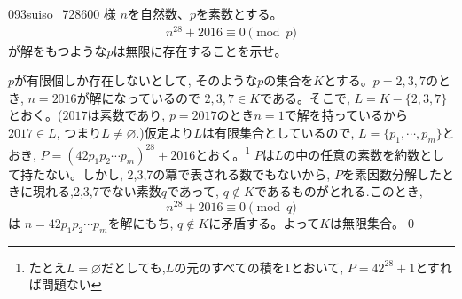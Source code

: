 \begin{thm}{093}{}{suiso\_728600 様}
 $n$を自然数、$p$を素数とする。
 \begin{align*}
  n^{28}+2016 \equiv 0 \pmod p
 \end{align*}
 が解をもつような$p$は無限に存在することを示せ。
\end{thm}

$p$が有限個しか存在しないとして, そのような$p$の集合を$K$とする。$p=2,3,7$のとき, $n=2016$が解になっているので $2,3,7\in K$である。そこで, $L=K-\{2,3,7\}$とおく。($2017$は素数であり, $p=2017$のとき$n=1$で解を持っているから $2017\in L$, つまり$L\neq \varnothing$.)仮定より$L$は有限集合としているので, $L=\{p_1,\cdots, p_m\}$とおき, $P=(42p_1p_2\cdots p_m)^{28} +2016$とおく。\footnote{たとえ$L=\varnothing$だとしても,$L$の元のすべての積を1とおいて, $P=42^{28}+1$とすれば問題ない} $P$は$L$の中の任意の素数を約数として持たない。しかし, 2,3,7の冪で表される数でもないから, $P$を素因数分解したときに現れる,2,3,7でない素数$q$であって, $q\notin K$であるものがとれる.このとき,  
\[n^{28}+2016\equiv 0 \pmod{q} \]
は $n=42p_1p_2\cdots p_m$を解にもち, $q\notin K$に矛盾する。よって$K$は無限集合。\qed

